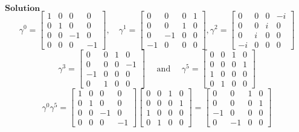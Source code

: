 \documentclass{styles/kaobook}
\begin{document}
$\boxed{\textbf{Solution}}$ 
$$
\gamma^{0}=\begin{bmatrix}
1 & 0 & 0 & 0 \\
0 & 1 & 0 & 0 \\
0 & 0 & -1 & 0 \\
0 & 0 & 0 & -1
\end{bmatrix}, \quad \gamma^{1}=\begin{bmatrix}
0 & 0 & 0 & 1 \\
0 & 0 & 1 & 0 \\
0 & -1 & 0 & 0 \\
-1 & 0 & 0 & 0
\end{bmatrix}, \gamma^{2}=\begin{bmatrix}
0 & 0 & 0 & -i \\
0 & 0 & i & 0 \\
0 & i & 0 & 0 \\
-i & 0 & 0 & 0
\end{bmatrix}
$$
$$
\gamma^{3}=\begin{bmatrix}
0 & 0 & 1 & 0 \\
0 & 0 & 0 & -1 \\
-1 & 0 & 0 & 0 \\
0 & 1 & 0 & 0
\end{bmatrix}\quad \text { and }\quad \gamma^{5}=\begin{bmatrix}
0 & 0 & 1 & 0 \\
0 & 0 & 0 & 1 \\
1 & 0 & 0 & 0 \\
0 & 1 & 0 & 0
\end{bmatrix}
$$
$$
\gamma^{0} \gamma^{5}=\begin{bmatrix}
1 & 0 & 0 & 0 \\
0 & 1 & 0 & 0 \\
0 & 0 & -1 & 0 \\
0 & 0 & 0 & -1
\end{bmatrix}\begin{bmatrix}
0 & 0 & 1 & 0 \\
0 & 0 & 0 & 1 \\
1 & 0 & 0 & 0 \\
0 & 1 & 0 & 0
\end{bmatrix}=\begin{bmatrix}
0 & 0 & 1 & 0 \\
0 & 0 & 0 & 1 \\
-1 & 0 & 0 & 0 \\
0 & -1 & 0 & 0
\end{bmatrix}
$$
\end{document}
